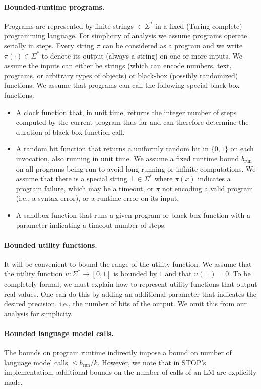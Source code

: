 \documentclass{article} %
\begin{document}
\paragraph{Bounded-runtime programs.}
Programs are represented by finite strings $\in \Sigma^*$ in a fixed (Turing-complete) programming language. For simplicity of analysis we assume programs operate serially in steps. Every string $\pi$ can be considered as a program and we write $\pi(\cdot)\in \Sigma^*$ to denote its output (always a string) on one or more inputs. 
We assume the inputs can either be strings (which can encode numbers, text, programs, or arbitrary types of objects) or black-box (possibly randomized) functions. We assume that programs can call the following special black-box  functions:
\begin{itemize}[leftmargin=0.5cm]
    \item A clock function that, in unit time, returns the integer number of steps computed by the current program thus far and can therefore determine the duration of black-box function call.
    \item A random bit function that returns a uniformly random bit in $\{0,1\}$ on each invocation, also running in unit time. We assume a fixed runtime bound $b_\text{run}$ on all programs being run to avoid long-running or infinite computations. We assume that there is a special string $\bot \in \Sigma^*$ where $\pi(x)$ indicates a program failure, which may be a timeout, or $\pi$ not encoding a valid program (i.e., a syntax error), or a runtime error on its input. 
    \item A sandbox function that runs a given program or black-box function with a parameter indicating a timeout number of steps.   
\end{itemize}

\paragraph{Bounded utility functions.}
It will be convenient to bound the range of the utility function. We assume that the utility function $u:\Sigma^*\rightarrow [0,1]$ is bounded by $1$ and that $u(\bot)=0$. To be completely formal, we must explain how to represent utility functions that output real values. One can do this by adding an additional parameter that indicates the desired precision, i.e., the number of bits of the output. We omit this from our analysis for simplicity.

\paragraph{Bounded language model calls.}
The bounds on program runtime indirectly impose a bound on number of language model calls $\le b_\text{run}/k$. However, we note that in STOP's implementation, additional bounds on the number of calls of an LM are explicitly made. 
\end{document}
